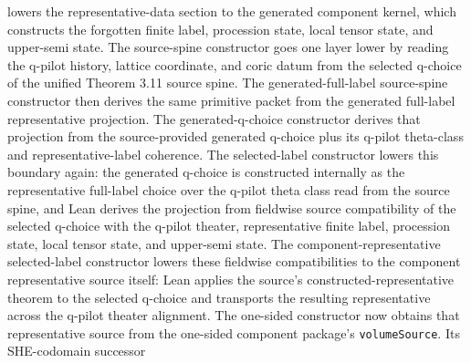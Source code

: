\begin{proposition}
  lowers the representative-data section to the generated component kernel,
  which constructs the forgotten finite label, procession state, local tensor
  state, and upper-semi state.  The source-spine constructor
  goes one layer lower by reading the q-pilot history, lattice coordinate, and
  coric datum from the selected q-choice of the unified Theorem 3.11 source
  spine.  The generated-full-label source-spine constructor
  then derives the same primitive packet from the generated full-label
  representative projection.  The generated-q-choice constructor
  derives that projection from the source-provided generated q-choice plus its
  q-pilot theta-class and representative-label coherence.  The selected-label
  constructor
  lowers this boundary again: the generated q-choice is constructed internally
  as the representative full-label choice over the q-pilot theta class read from
  the source spine, and Lean derives the projection from fieldwise source
  compatibility of the selected q-choice with the q-pilot theater,
  representative finite label, procession state, local tensor state, and
  upper-semi state.  The component-representative selected-label constructor
  lowers these fieldwise compatibilities to the component representative source
  itself: Lean applies the source's constructed-representative theorem to the
  selected q-choice and transports the resulting representative across the
  q-pilot theater alignment.  The one-sided constructor
  now obtains that representative source from the one-sided component package's
  \texttt{volumeSource}.  Its SHE-codomain successor

\end{proposition}
